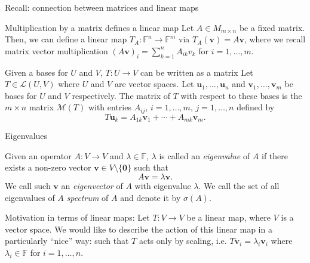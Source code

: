 \documentclass [aspectratio=169]{beamer}
\newcommand{\bu}{{\mathbf{u}}}
\newcommand{\bv}{{\mathbf{v}}}
\newcommand{\zerovec}{{\mathbf{0}}}
\newcommand{\F}{{\mathbb{F}}}
\begin{document}
\begin{frame}{Recall: connection between matrices and linear maps}
\begin{block}{Multiplication by a matrix defines a linear map}
Let $A\in M_{m\times n}$ be a fixed matrix. Then, we can define a linear map $T_A \colon \F^n \to \F^m$ via $T_A(\bv) = A \bv$, where we recall matrix vector multiplication $(A\bv)_i = \sum_{k=1}^n A_{ik}v_k$ for $i=1, \ldots, m$.
\end{block}

\vspace{1em}

\begin{block}{Given a bases for $U$ and $V$, $T: U \to V$ can be written as a matrix}
Let $T \in \mathcal{L}(U,V)$ where $U$ and $V$ are vector spaces. Let $\bu_1, \ldots, \bu_n$ and $\bv_1, \ldots, \bv_m$ be bases for $U$ and $V$ respectively. The matrix of $T$ with respect to these bases is the $m \times n$ matrix $\mathcal{M}(T)$ with entries $A_{ij}$, $i = 1, \ldots, m$, $j = 1, \ldots, n$ defined by
\begin{equation*}
    T\bu_k = A_{1k} \bv_1 + \cdots + A_{mk} \bv_m.
\end{equation*}
\end{block}
\end{frame}

\begin{frame}{Eigenvalues}
\begin{definition}
Given an operator $A \colon V \to V$ and $\lambda \in \F$, $\lambda$ is called an \emph{eigenvalue} of $A$ if there exists a non-zero vector $\bv \in V\setminus\{\zerovec\}$ such that 
$$A \bv = \lambda \bv.$$
We call such $\bv$ an \emph{eigenvector} of $A$ with eigenvalue $\lambda$. We call the set of all eigenvalues of $A$ \emph{spectrum} of $A$ and denote it by $\sigma(A)$.
\end{definition}

\vspace{1em}

Motivation in terms of linear maps: Let $T \colon V \to V$ be a linear map, where $V$ is a vector space.  We would like to describe the action of this linear map in a particularly ``nice'' way: such that $T$ acts only by scaling, i.e. $T\bv_i = \lambda_i \bv_i$ where $\lambda_i \in \F$ for $i = 1, \ldots, n$.
\end{frame}
\end{document}

